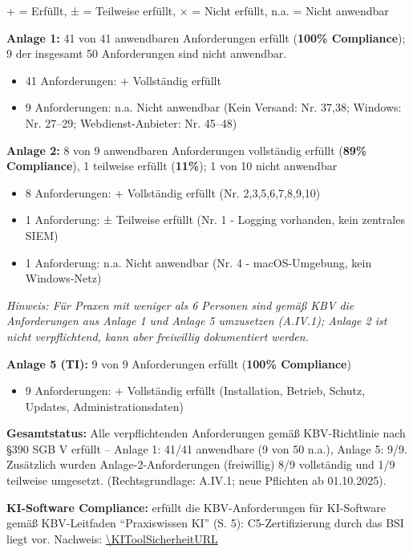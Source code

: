 \Legende + = Erfüllt, ± = Teilweise erfüllt, × = Nicht erfüllt, n.a. = Nicht anwendbar

\textbf{Anlage 1:} 41 von 41 anwendbaren Anforderungen erfüllt (\textbf{100\% Compliance});
9 der insgesamt 50 Anforderungen sind nicht anwendbar.
\begin{itemize}
  \item 41 Anforderungen: + Vollständig erfüllt
  \item 9 Anforderungen: n.a. Nicht anwendbar (Kein Versand: Nr. 37,38; Windows: Nr.
    27–29; Webdienst-Anbieter: Nr. 45–48)
\end{itemize}

\textbf{Anlage 2:} 8 von 9 anwendbaren Anforderungen vollständig erfüllt (\textbf{89\%
Compliance}), 1 teilweise erfüllt (\textbf{11\%}); 1 von 10 nicht anwendbar
\begin{itemize}
  \item 8 Anforderungen: + Vollständig erfüllt (Nr. 2,3,5,6,7,8,9,10)
  \item 1 Anforderung: ± Teilweise erfüllt (Nr. 1 - Logging vorhanden, kein zentrales SIEM)
  \item 1 Anforderung: n.a. Nicht anwendbar (Nr. 4 - macOS-Umgebung, kein Windows-Netz)
\end{itemize}

\textit{Hinweis: Für Praxen mit weniger als 6 Personen sind gemäß KBV die Anforderungen
  aus Anlage 1 und Anlage 5 umzusetzen (A.IV.1); Anlage 2 ist nicht verpflichtend, kann
aber freiwillig dokumentiert werden.}

\textbf{Anlage 5 (TI):} 9 von 9 Anforderungen erfüllt (\textbf{100\% Compliance})
\begin{itemize}
  \item 9 Anforderungen: + Vollständig erfüllt (Installation, Betrieb, Schutz, Updates,
    Administrationsdaten)
\end{itemize}

\textbf{Gesamtstatus:} Alle verpflichtenden Anforderungen gemäß KBV-Richtlinie nach
§390 SGB V erfüllt -- Anlage 1: 41/41 anwendbare (9 von 50 n.a.), Anlage 5: 9/9.
Zusätzlich wurden Anlage-2-Anforderungen (freiwillig) 8/9 vollständig und 1/9 teilweise
umgesetzt. (Rechtsgrundlage: A.IV.1; neue Pflichten ab 01.10.2025).

\textbf{KI-Software Compliance:} \KIToolName{} erfüllt die KBV-Anforderungen für KI-Software
gemäß KBV-Leitfaden \enquote{Praxiswissen KI} (S. 5): C5-Zertifizierung durch das BSI liegt vor.
Nachweis: \url{\KIToolSicherheitURL}

\normalsize
\vspace{1cm}
